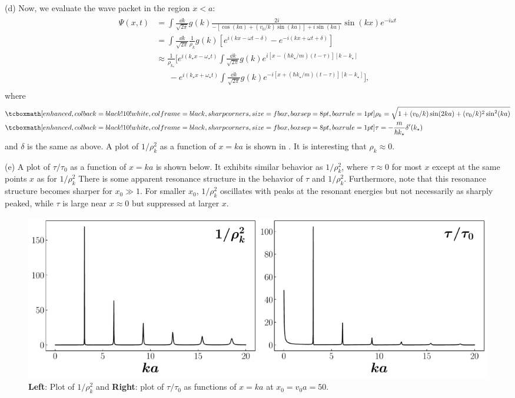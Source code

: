 {(d) Now, we evaluate the wave packet in the region $x < a$:
\begin{eqnarray}
    \begin{aligned}
        \Psi(x,t) &= \int \frac{\dd{k}}{\sqrt{2\pi}} g(k) \frac{2i}{-[\cos(ka) + (v_0/k) \sin(ka)] + i\sin(ka)} \sin(kx) e^{-i \omega t} \\
                  &= \int \frac{\dd{k}}{\sqrt{2 \pi}} \frac{1}{\rho_{k}} g(k) [e^{i(kx-\omega t - \delta)} - e^{-i(kx+\omega t + \delta)}] \\
                  &\approx \frac{1}{\rho_{k_{\star}}} \Bigg[ e^{i(k_{\star}x - \omega_{\star} t)} \int \frac{\dd{k}}{\sqrt{2\pi}} g(k) e^{i[x - (\hbar k_{\star}/m)(t - \tau) ][k - k_{\star}]} \\
                  &\phantom{\frac{1}{\rho_{k_{\star}}}\Bigg[~} - e^{i(k_{\star}x + \omega_{\star}t)} \int \frac{\dd{k}}{\sqrt{2\pi}} g(k) e^{-i[x + (\hbar k_{\star}/m)(t - \tau)][k - k_{\star}]} \Bigg]
    ,\end{aligned}
\end{eqnarray}
where 
\begin{align}
    &\eqbox{ \rho_{k} = \sqrt{1 + (v_0/k)\sin(2ka) + (v_0/k)^2 \sin^2(ka)} } \\
    &\eqbox{ \tau = - \frac{m}{\hbar k_{\star}} \delta'(k_{\star}) }
\end{align}
and $\delta$ is the same as above.
A plot of $1/\rho_{k}^2$ as a function of $x = ka$ is shown in .
It is interesting that $\rho_{k} \approx 0$. 

(e) A plot of $\tau/\tau_0$ as a function of $x = ka$ is shown below.
It exhibits similar behavior as $1/\rho_{k}^2$, where $\tau \approx 0$ for most $x$ except at the same points $x$ as for $1/\rho_{k}^2$ 
There is some apparent resonance structure in the behavior of $\tau$ and $1/\rho_{k}^2$.
Furthermore, note that this resonance structure becomes sharper for $x_0 \gg 1$.
For smaller $x_0$, $1/\rho_{k}^2$ oscillates with peaks at the resonant energies but not necessarily as sharply peaked, while $\tau$ is large near $x \approx 0$ but suppressed at larger $x$.

\begin{figure}[h!]
    \centering
    \includegraphics[width=\textwidth]{prob4.pdf}
    \caption{\textbf{Left}: Plot of $1/\rho_{k}^2$ and \textbf{Right}: plot of $\tau/\tau_0$ as functions of $x = ka$ at $x_0 = v_0a = 50$.}
    \label{fig:prob4}
\end{figure}



}



